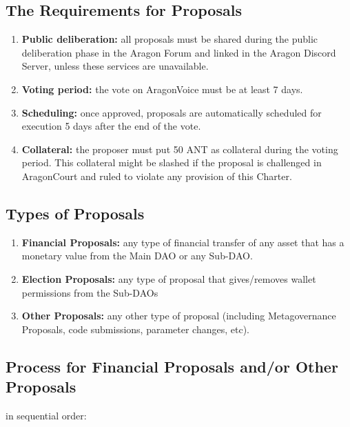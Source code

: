 \subsection{The Requirements for Proposals}

\begin{enumerate}
	\item \textbf{Public deliberation:} all proposals must be shared during the public deliberation phase in the Aragon Forum and linked in the Aragon Discord Server, unless these services are unavailable.
	\item \textbf{Voting period:} the vote on \gls{AragonVoice} must be at least 7 days.
	\item \textbf{Scheduling:} once approved, proposals are automatically scheduled for execution 5 days after the end of the vote.
	\item \textbf{Collateral:} the proposer must put 50 \ac{ANT} as collateral during the voting period.
	This collateral might be slashed if the proposal is challenged in \gls{AragonCourt} and ruled to violate any provision of this Charter.
\end{enumerate}


\subsection{Types of Proposals}

\begin{enumerate}		
	\item \textbf{Financial Proposals:} any type of financial transfer of any asset that has a monetary value from the Main \ac{DAO} or any Sub-\ac{DAO}.
	\item \textbf{Election Proposals:} any type of proposal that gives/removes wallet permissions from the Sub-\acp{DAO}
	\item \textbf{Other Proposals:} any other type of proposal (including Metagovernance Proposals, code submissions, parameter changes, etc).
\end{enumerate}

\subsection{Process for Financial Proposals and/or Other Proposals} 
 in sequential order:


